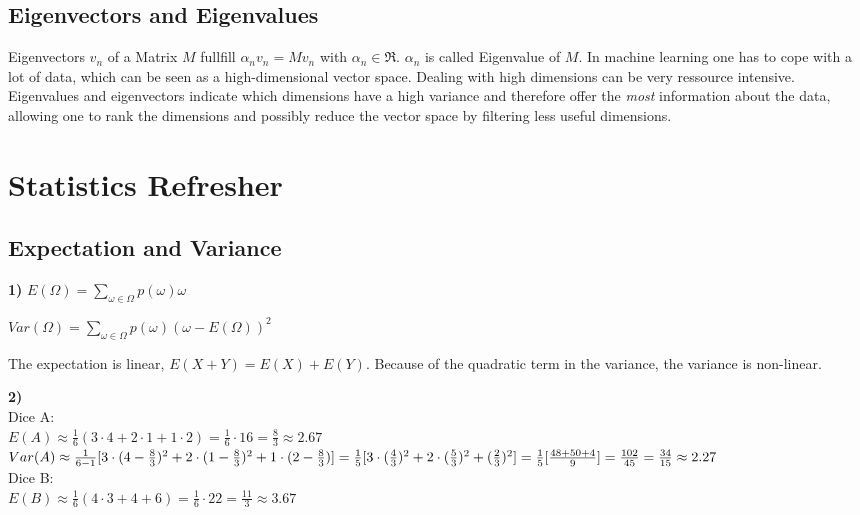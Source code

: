 \documentclass[accentcolor=tud9c]{tudexercise}
\begin{document}
	\subsection{Eigenvectors and Eigenvalues}
	Eigenvectors $v_n$ of a Matrix $M$ fullfill $\alpha_n  v_n = Mv_n $ with $\alpha_n \in \Re$. $\alpha_n$ is called Eigenvalue of $M$. In machine learning one has to cope with a lot of data, which can be seen as a high-dimensional vector space. Dealing with high dimensions can be very ressource intensive. Eigenvalues and eigenvectors indicate which dimensions have a high variance and therefore offer the \emph{most} information about the data, allowing one to rank the dimensions and possibly reduce the vector space by filtering less useful dimensions.
	
	\section{Statistics Refresher}
	\subsection{Expectation and Variance}
	\textbf{1)}
	$ E(\Omega) = \sum_{\omega \in \Omega} p(\omega)\omega$
	
	$Var(\Omega) = {\sum_{\omega \in \Omega} p(\omega)(\omega - E(\Omega))^2}$
	
	The expectation is linear, $ E(X+Y) = E(X) + E(Y) $. Because of the quadratic term in the variance, the variance is non-linear.
	
	\noindent \textbf{2)}\\
	Dice A:\\
	
	$ E(A) \approx \frac{1}{6} (3 \cdot 4 + 2 \cdot 1 + 1 \cdot 2)  = \frac{1}{6} \cdot 16 = \frac{8}{3} \approx 2.67$\\
	
	$ Var(A) \approx \frac{1}{6-1} [3 \cdot (4-\frac{8}{3})^2 + 2 \cdot (1-\frac{8}{3})^2 + 1 \cdot (2-\frac{8}{3})]\\
	= \frac{1}{5} [3\cdot (\frac{4}{3}) ^2 + 2\cdot (\frac{5}{3}) ^2 + (\frac{2}{3}) ^2]\\
	= \frac{1}{5}[\frac{48+50+4}{9}] = \frac{102}{45} = \frac{34}{15} \approx 2.27$\\
	
	\noindent Dice B:\\
	
	$E(B) \approx \frac{1}{6}(4 \cdot 3 + 4 +6) = \frac{1}{6} \cdot 22 = \frac{11}{3} \approx 3.67 $\\
	
\end{document}
